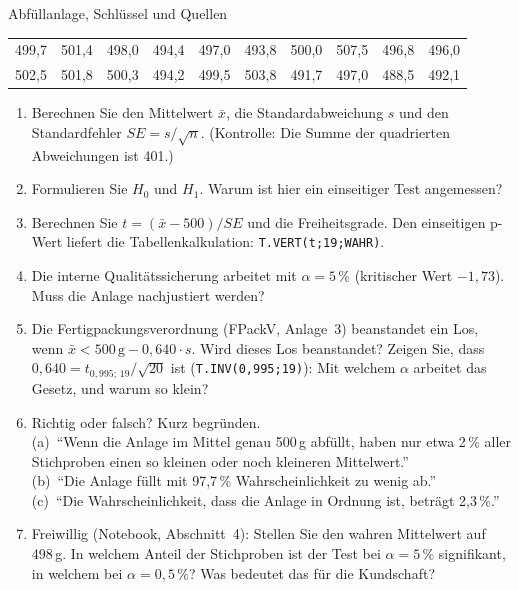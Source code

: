 \begin{uebungsblattc}{Abfüllanlage, Schlüssel und Quellen}
\begin{center}
\small
\setlength{\tabcolsep}{4pt}
\begin{tabular}{@{}*{10}{c}@{}}
\toprule
499,7 & 501,4 & 498,0 & 494,4 & 497,0 & 493,8 & 500,0 & 507,5 & 496,8 & 496,0 \\
502,5 & 501,8 & 500,3 & 494,2 & 499,5 & 503,8 & 491,7 & 497,0 & 488,5 & 492,1 \\
\bottomrule
\end{tabular}
\end{center}
\begin{enumerate}
  \item Berechnen Sie den Mittelwert $\bar{x}$, die Standardabweichung $s$
    und den Standardfehler $\mathit{SE}=s/\sqrt{n}$. (Kontrolle: Die
    Summe der quadrierten Abweichungen ist 401.)
  \item Formulieren Sie $H_0$ und $H_1$. Warum ist hier ein einseitiger
    Test angemessen?
  \item Berechnen Sie $t=(\bar{x}-500)/\mathit{SE}$ und die
    Freiheitsgrade. Den einseitigen p-Wert liefert die
    Tabellenkalkulation: \texttt{T.VERT(t;19;WAHR)}.
  \item Die interne Qualitätssicherung arbeitet mit $\alpha=5\,\%$
    (kritischer Wert $-1{,}73$). Muss die Anlage nachjustiert werden?
  \item Die Fertigpackungsverordnung (FPackV, Anlage~3) beanstandet ein
    Los, wenn $\bar{x}<500\,\text{g}-0{,}640\cdot s$. Wird dieses Los
    beanstandet? Zeigen Sie, dass $0{,}640=t_{0,995;\,19}/\sqrt{20}$ ist
    (\texttt{T.INV(0,995;19)}): Mit welchem $\alpha$ arbeitet das Gesetz,
    und warum so klein?
  \item Richtig oder falsch? Kurz begründen.\\
    (a)~\enquote{Wenn die Anlage im Mittel genau 500\,g abfüllt, haben nur
    etwa 2\,\% aller Stichproben einen so kleinen oder noch kleineren
    Mittelwert.}\\
    (b)~\enquote{Die Anlage füllt mit 97,7\,\% Wahrscheinlichkeit zu
    wenig ab.}\\
    (c)~\enquote{Die Wahrscheinlichkeit, dass die Anlage in Ordnung ist,
    beträgt 2,3\,\%.}
  \item Freiwillig (Notebook, Abschnitt~4): Stellen Sie den wahren
    Mittelwert auf 498\,g. In welchem Anteil der Stichproben ist der Test
    bei $\alpha=5\,\%$ signifikant, in welchem bei $\alpha=0{,}5\,\%$? Was
    bedeutet das für die Kundschaft?
\end{enumerate}


\end{uebungsblattc}
